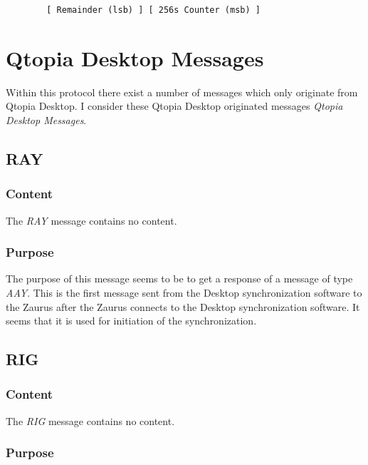         \begin{verbatim}
        [ Remainder (lsb) ] [ 256s Counter (msb) ]
        \end{verbatim}

    \section{Qtopia Desktop Messages}

    \label{qtopia:msgs}
    Within this protocol there exist a number of messages which only
    originate from Qtopia Desktop. I consider these Qtopia Desktop
    originated messages \emph{Qtopia Desktop Messages}.

        \subsection{RAY}

            \subsubsection{Content}

            The \emph{RAY} message contains no content.

            \subsubsection{Purpose}

            The purpose of this message seems to be to get a response of a
            message of type \emph{AAY}. This is the first message sent from
            the Desktop synchronization software to the Zaurus after the
            Zaurus connects to the Desktop synchronization software. It seems
            that it is used for initiation of the synchronization.

        \subsection{RIG}

            \subsubsection{Content}

            The \emph{RIG} message contains no content.

            \subsubsection{Purpose}

